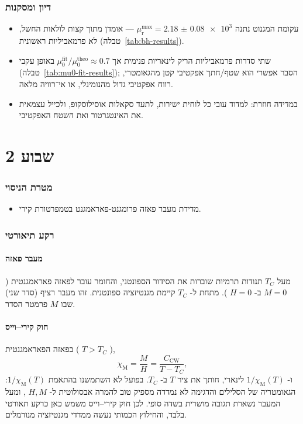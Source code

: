 \documentclass{extarticle}
\begin{document}
\section{דיון ומסקנות}
\begin{itemize}
\item עקומת המגנוט נתנה
$\mu_{\mathrm{r}}^{\max}=\num{2.18(8)e3}$
— אומדן מתוך קצות לולאות החשל, לא פרמאביליות ראשונית (טבלה~\ref{tab:bh-results}).
\item שתי סדרות פרמאביליות הריק לינאריות פנימית אך
$\mu_0^{\mathrm{fit}}/\mu_0^{\mathrm{theo}}\approx0.7$
באופן עקבי (טבלה~\ref{tab:mu0-fit-results}); הסבר אפשרי הוא שטף/חתך אפקטיבי קטן מהגאומטרי, רווח אפקטיבי גדול מהנומינלי, או אי־רוויה מלאה.
\item במדידה חוזרת: למדוד עובי כל לוחית ישירות, לתעד סקאלות אוסילוסקופ, ולכייל עצמאית את האינטגרטור ואת השטח האפקטיבי.
\end{itemize}

\pagebreak{}

\part{שבוע 2}
\label{part:week2}

\section{מטרת הניסוי}
\begin{itemize}
\item מדידת מעבר פאזה פרומגנט-פאראמגנט בטמפרטורת קירי.
\end{itemize}

\section{רקע תיאורטי}

\subsection{מעבר פאזה}
מעל
$T_C$
תנודות תרמיות שוברות את הסידור הספונטני, והחומר עובר לפאזה פאראמגנטית (
$M=0$
ב-
$H=0$
). מתחת ל-
$T_C$
קיימת מגנטיזציה ספונטנית. זהו מעבר רציף (סדר שני) שבו
$M$
פרמטר הסדר.

\subsection{חוק קירי--וייס}
בפאזה הפאראמגנטית (
$T>T_C$
),
\begin{equation}
\chi_{\mathrm{M}}=\frac{M}{H}=\frac{C_{\mathrm{CW}}}{T-T_C},
\end{equation}
ו-
$1/\chi_{\mathrm{M}}(T)$
לינארי, חותך את ציר
$T$
ב-
$T_C$.
בפועל לא השתמשנו בהתאמת
$1/\chi_{\mathrm{M}}(T)$:
הגאומטריה של הסלילים והדגימה לא נמדדה מספיק טוב להמרה אבסולוטית ל-
$H,M$
, ומעל המעבר נשארת תגובה מושרית בשדה סופי. לכן חוק קירי--וייס משמש כאן כרקע תאורטי בלבד, והחילוץ הכמותי נעשה ממדדי מגנטיזציה מנורמלים.
\end{document}
